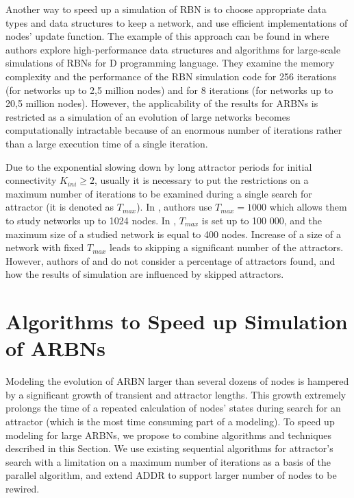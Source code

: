\documentclass[procedia]{easychair}
\begin{document}
	Another way to speed up a simulation of RBN is to choose appropriate data types and data structures to keep a network, and use efficient implementations of nodes' update function. The example of this approach can be found in \cite{hawick2007simulating} where authors explore high-performance data structures and algorithms for large-scale simulations of RBNs for D programming language. They examine the memory complexity and the performance of the RBN simulation code for 256 iterations (for networks up to 2,5 million nodes) and for 8 iterations (for networks up to 20,5 million nodes). However, the applicability of the results for ARBNs is restricted as a simulation of an evolution of large networks becomes computationally intractable because of an enormous number of iterations rather than a large execution time of a single iteration.
	
	Due to the exponential slowing down by long attractor periods for initial connectivity $K_{ini} \geq 2$, usually it is necessary to put the restrictions on a maximum number of iterations to be examined during a single search for attractor (it is denoted as $T_{max}$). In \cite{bornholdt2000topological}, authors use $T_{max} = 1000$ which allows them to study networks up to 1024 nodes. In \cite{mlb}, $T_{max}$ is set up to 100 000, and the maximum size of a studied network is equal to 400 nodes. Increase of a size of a network with fixed $T_{max}$ leads to skipping a significant number of the attractors. However, authors of \cite{bornholdt2000topological} and \cite{mlb} do not consider a percentage of attractors found, and how the results of simulation are influenced by skipped attractors.
	

	\section{Algorithms to Speed up Simulation of ARBNs}
	\label{sect:algorithm}
	
	
	Modeling the evolution of ARBN larger than several dozens of nodes is hampered by a significant growth of transient and attractor lengths. This growth extremely prolongs the time of a repeated calculation of nodes' states during search for an attractor (which is the most time consuming part of a modeling). To speed up modeling for large ARBNs, we propose to combine algorithms and techniques described in this Section. We use existing sequential algorithms for attractor's search with a limitation on a maximum number of iterations as a basis of the parallel algorithm, and extend ADDR to support larger number of nodes to be rewired. 
	
\end{document}
